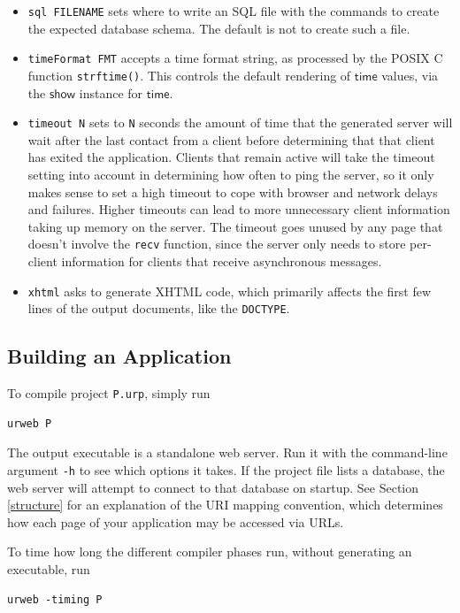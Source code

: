 \documentclass{article}
\newcommand{\mt}[1]{\mathsf{#1}}
\begin{document}
\begin{itemize}
\item \texttt{sql FILENAME} sets where to write an SQL file with the commands to create the expected database schema.  The default is not to create such a file.
\item \texttt{timeFormat FMT} accepts a time format string, as processed by the POSIX C function \texttt{strftime()}.  This controls the default rendering of $\mt{time}$ values, via the $\mt{show}$ instance for $\mt{time}$.
\item \texttt{timeout N} sets to \texttt{N} seconds the amount of time that the generated server will wait after the last contact from a client before determining that that client has exited the application.  Clients that remain active will take the timeout setting into account in determining how often to ping the server, so it only makes sense to set a high timeout to cope with browser and network delays and failures.  Higher timeouts can lead to more unnecessary client information taking up memory on the server.  The timeout goes unused by any page that doesn't involve the \texttt{recv} function, since the server only needs to store per-client information for clients that receive asynchronous messages.
\item \texttt{xhtml} asks to generate XHTML code, which primarily affects the first few lines of the output documents, like the \texttt{DOCTYPE}.
\end{itemize}


\subsection{Building an Application}

To compile project \texttt{P.urp}, simply run
\begin{verbatim}
urweb P
\end{verbatim}
The output executable is a standalone web server.  Run it with the command-line argument \texttt{-h} to see which options it takes.  If the project file lists a database, the web server will attempt to connect to that database on startup.  See Section \ref{structure} for an explanation of the URI mapping convention, which determines how each page of your application may be accessed via URLs.

To time how long the different compiler phases run, without generating an executable, run
\begin{verbatim}
urweb -timing P
\end{verbatim}
\end{document}
